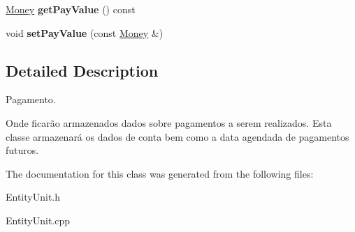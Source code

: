 \begin{DoxyCompactItemize}
\item 
\hypertarget{classPayment_a3a2d6a8dc3f6b63e924504e1994ae556}{\hyperlink{classMoney}{Money} {\bfseries get\-Pay\-Value} () const }\label{classPayment_a3a2d6a8dc3f6b63e924504e1994ae556}

\item 
\hypertarget{classPayment_ace63ad77804d5a19ace50aa1a7335050}{void {\bfseries set\-Pay\-Value} (const \hyperlink{classMoney}{Money} \&)}\label{classPayment_ace63ad77804d5a19ace50aa1a7335050}

\end{DoxyCompactItemize}


\subsection{Detailed Description}
Pagamento. 

Onde ficarão armazenados dados sobre pagamentos a serem realizados. Esta classe armazenará os dados de conta bem como a data agendada de pagamentos futuros. 

The documentation for this class was generated from the following files\-:\begin{DoxyCompactItemize}
\item 
Entity\-Unit.\-h\item 
Entity\-Unit.\-cpp\end{DoxyCompactItemize}
